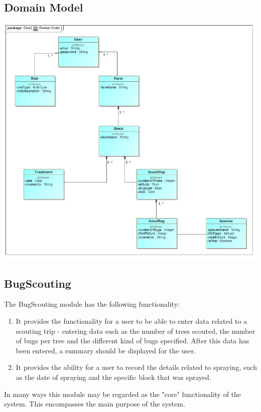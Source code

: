 \documentclass[11pt,a4paper,titlepage]{article}
\begin{document}
	\subsection{Domain Model}
		\includegraphics[width=\linewidth]{DomainModel}

	\subsection{BugScouting}
		The BugScouting module has the following functionality:
		\begin{enumerate}
			\item It provides the functionality for a user to be able to enter data related to a scouting trip - entering data such as the number of trees scouted, the number of bugs per tree and the different kind of bugs specified. After this data has been entered, a summary should be displayed for the user.
			\item It provides the ability for a user to record the details related to spraying, such as the date of spraying and the specific block that was sprayed.
		\end{enumerate}

		In many ways this module may be regarded as the "core" functionality of the system. This encompasses the main purpose of the system.
\end{document}
